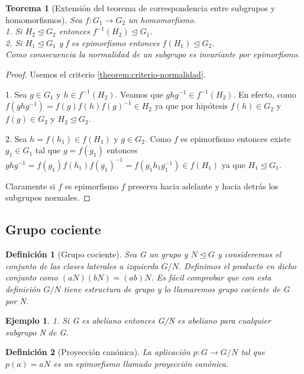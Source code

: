 \documentclass{article}
\theoremstyle{theorem-style}  %
\newtheorem{theorem}{Teorema}[section]  %
\theoremstyle{definition-style}
\newtheorem{definition}{Definición}[section]
\theoremstyle{example-style}
\newtheorem{example}{Ejemplo}[section]
\begin{document}
\begin{theorem}[Extensión del teorema de correspondencia entre subgrupos y homomorfismos]
Sea $f: G_1 \rightarrow G_2$ un homomorfismo.\\
1. Si $H_2 \trianglelefteq G_2$ entonces $f^{-1}(H_2) \trianglelefteq G_1$. \\
2. Si $H_1 \trianglelefteq G_1$ y f es epimorfismo entonces $f(H_1) \trianglelefteq G_2$. \\
Como consecuencia la normalidad de un subgrupo es invariante por epimorfismo.
\end{theorem}
\begin{proof}
Usemos el criterio \ref{theorem:criterio-normalidad}. 

1. Sea $g \in G_1$ y $h \in f^{-1}(H_2)$. Veamos que $ghg^{-1} \in f^{-1}(H_2)$. En efecto, como $f(ghg^{-1}) = f(g)f(h)f(g)^{-1} \in H_2$ ya que por hipótesis $f(h) \in G_2$ y $f(g) \in G_2$ y $H_2 \trianglelefteq G_2$.

2. Sea $h=f(h_1) \in f(H_1)$ y $g \in G_2$. Como $f$ es epimorfismo entonces existe $g_1 \in G_1$ tal que $g = f(g_1)$ entonces $ghg^{-1} = f(g_1)f(h_1)f(g_1)^{-1} = f(g_1h_1g_1^{-1}) \in f(H_1)$ ya que $H_1 \trianglelefteq G_1$.

Claramente si $f$ es epimorfismo $f$ preserva hacia adelante y hacia detrás los subgrupos normales.
\end{proof}

\subsection{Grupo cociente}

\begin{definition}[Grupo cociente]
Sea G un grupo y $N \unlhd G$ y consideremos el conjunto de las clases laterales a izquierda $G/N$. Definimos el producto en dicho conjunto como $(aN)(bN) = (ab)N$. Es fácil comprobar que con esta definición $G/N$ tiene estructura de grupo y lo llamaremos grupo cociente de G por N.
\end{definition}

\begin{example}
1. Si G es abeliano entonces G/N es abeliano para cualquier subgrupo N de G.
\end{example}

\begin{definition}[Proyección canónica]
La aplicación $p:G \rightarrow G/N$ tal que $p(a) = aN$ es un epimorfismo llamado proyección canónica.
\end{definition}
\end{document}
